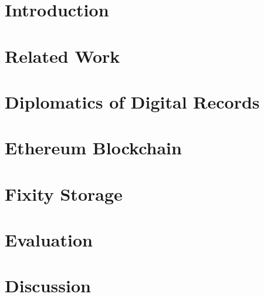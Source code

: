 \documentclass[final]{vutinfth} %
\begin{document}
\frontmatter %

\addstatementpage

\begin{kurzfassung}

\end{kurzfassung}

\begin{abstract}

\end{abstract}


\tableofcontents %

\mainmatter

\chapter{Introduction}

\chapter{Related Work}

\chapter{Diplomatics of Digital Records}
\label{ch:diplomatics}


\chapter{Ethereum Blockchain}
\label{ch:ethereum}

\chapter{Fixity Storage}
\label{ch:fixity-storage}

\chapter{Evaluation}
\label{ch:evaluation}

\chapter{Discussion}

\end{document}
